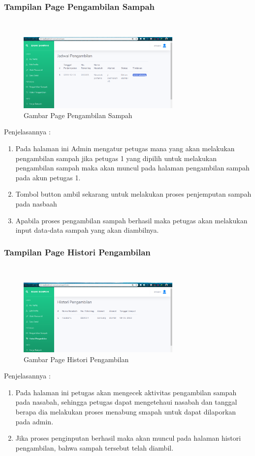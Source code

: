 \subsubsection{Tampilan Page Pengambilan Sampah}
\hfill\\
	\begin{figure}[H]
		\includegraphics[width=8cm]{figures/analisis/30.png}
		\centering
		\caption{Gambar Page Pengambilan Sampah}
	\end{figure}
Penjelasannya :
\begin{enumerate}
\item Pada halaman ini Admin mengatur petugas mana yang akan melakukan pengambilan sampah jika petugas 1 yang dipilih untuk melakukan pengambilan sampah maka akan muncul pada halaman pengambilan sampah pada akun petugas 1.
\item Tombol button ambil sekarang untuk melakukan proses penjemputan sampah pada nasbaah
\item Apabila proses pengambilan sampah berhasil maka petugas akan melakukan input data-data sampah yang akan diambilnya.
\end{enumerate}
	
\subsubsection{Tampilan Page Histori Pengambilan}
\hfill\\
	\begin{figure}[H]
		\includegraphics[width=8cm]{figures/analisis/31.png}
		\centering
		\caption{Gambar Page Histori Pengambilan}
	\end{figure}
Penjelasannya :
\begin{enumerate}
\item Pada halaman ini petugas akan mengecek aktivitas pengambilan sampah pada nasabah, sehingga petugas dapat mengetehaui nasabah dan tanggal berapa dia melakukan proses menabung smapah untuk dapat dilaporkan pada admin.
\item Jika proses penginputan berhasil maka akan muncul pada halaman histori pengambilan, bahwa sampah tersebut telah diambil.
\end{enumerate}	

